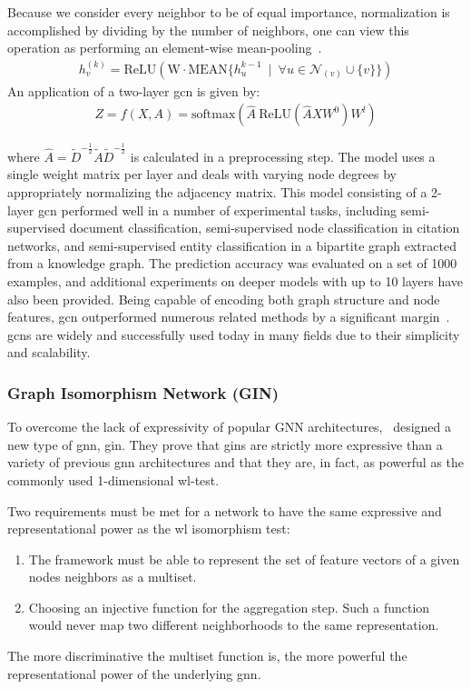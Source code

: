 Because we consider every neighbor to be of equal importance, normalization is accomplished
by dividing by the number of neighbors, one can view this operation as performing an element-wise
mean-pooling~\cite{Xu2019}.
\begin{align*}
    h_{v}^{(k)} = \mathrm{ReLU}(\mathrm{W} \cdot\mathrm{MEAN} \{h_{u}^{k-1}\ \mid \ \forall{u} \in \mathcal{N}_{(v)} \cup \{v\}\})
\end{align*}
An application of a two-layer \ac{gcn} is given by:
\begin{align*}
    Z = f(X,A) = \mathrm{softmax} (\hat{A}\ \mathrm{ReLU}(\hat{A}XW^{0})W^{l})
\end{align*}

where $\hat{A} = \tilde{D}^{-\frac{1}{2}}\tilde{A}\tilde{D}^{-\frac{1}{2}}$ is calculated in a preprocessing step.
The model uses a single weight matrix per layer and deals with varying node degrees by appropriately normalizing the adjacency matrix.
This model consisting of a 2-layer \ac{gcn} performed well in a number of experimental tasks, including semi-supervised document classification, semi-supervised node classification in citation networks, and semi-supervised entity classification in a bipartite graph extracted from a knowledge graph.
The prediction accuracy was evaluated on a set of 1000 examples, and additional experiments on deeper models with up to 10 layers have also been provided. Being capable of encoding both graph structure and node features, \ac{gcn} outperformed numerous related methods by a significant margin~\cite{Kipf2017}.
\Acfp{gcn} are widely and successfully used today in many fields due to their simplicity and scalability.

\subsubsection{Graph Isomorphism Network (GIN)}
\label{sec:related:architectures:gin}
To overcome the lack of expressivity of popular GNN architectures,~\citet{Xu2019} designed a new type of \ac{gnn}, \acf{gin}. They prove that \acp{gin} are strictly more expressive than a variety of previous \ac{gnn} architectures and that they are, in fact, as powerful as the commonly used 1-dimensional \acf{wl}-test.

Two requirements must be met for a network to have the same expressive and representational
power as the \ac{wl} isomorphism test:
\begin{enumerate}
    \item The framework must be able to represent the set of feature vectors of a given nodes
          neighbors as a multiset.
    \item Choosing an injective function for the aggregation step. Such a function would never
          map two different neighborhoods to the same representation.
\end{enumerate}
The more discriminative the multiset function is, the more powerful the representational power of the underlying \ac{gnn}.

